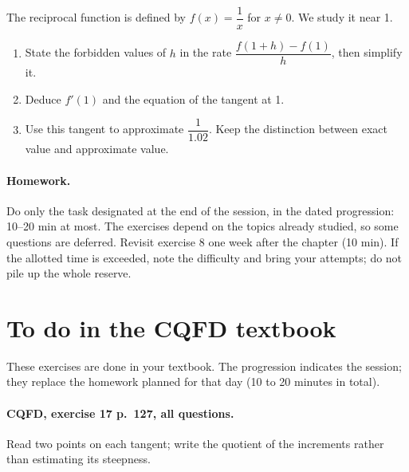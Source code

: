 The reciprocal function is defined by $f(x)=\dfrac1x$ for $x\ne0$. We study it near 1.
\begin{enumerate}[label=\arabic*.]
\item State the forbidden values of $h$ in the rate $\dfrac{f(1+h)-f(1)}h$, then simplify it.
\item Deduce $f\prime(1)$ and the equation of the tangent at 1.
\item Use this tangent to approximate $\dfrac1{1.02}$. Keep the distinction between exact value and approximate value.
\end{enumerate}
\paragraph{Homework.} Do only the task designated at the end of the session, in the dated progression: 10--20 min at most. The exercises depend on the topics already studied, so some questions are deferred. Revisit exercise 8 one week after the chapter (10 min). If the allotted time is exceeded, note the difficulty and bring your attempts; do not pile up the whole reserve.
\endgroup
{}\section*{To do in the CQFD textbook}
These exercises are done in your textbook. The progression indicates the session; they replace the homework planned for that day (10 to 20 minutes in total).
\paragraph{CQFD, exercise 17 p.~127, all questions.}\label{C04-M1} Read two points on each tangent; write the quotient of the increments rather than estimating its steepness.

